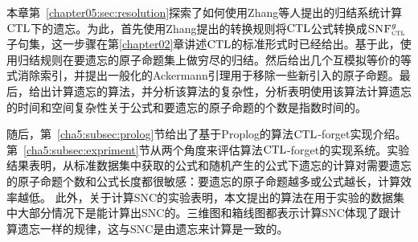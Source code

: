 本章第~\ref{chapter05:sec:resolution}探索了如何使用Zhang等人提出的归结系统计算$\textrm{CTL}$下的遗忘。为此，首先使用Zhang提出的转换规则将$\textrm{CTL}$公式转换成${\textsc{SNF}_{\textsc{ctl}}^g}$子句集，这一步骤在第\ref{chapter02}章讲述$\textrm{CTL}$的标准形式时已经给出。基于此，使用归结规则在要遗忘的原子命题集上做穷尽的归结。然后给出几个互模拟等价的等式消除索引，并提出一般化的Ackermann引理用于移除一些新引入的原子命题。最后，给出计算遗忘的算法，并分析该算法的复杂性，分析表明使用该算法计算遗忘的时间和空间复杂性关于公式和要遗忘的原子命题的个数是指数时间的。


随后，第~\ref{cha5:subsec:prolog}节给出了基于Proplog的算法$\textrm{CTL}$-forget实现介绍。第~\ref{cha5:subsec:expriment}节从两个角度来评估算法$\textrm{CTL}$-forget的实现系统。实验结果表明，从标准数据集中获取的公式和随机产生的公式下遗忘的计算对需要遗忘的原子命题个数和公式长度都很敏感：要遗忘的原子命题越多或公式越长，计算效率越低。
此外，关于计算SNC的实验表明，本文提出的算法在用于实验的数据集中大部分情况下是能计算出SNC的。三维图和箱线图都表示计算SNC体现了跟计算遗忘一样的规律，这与SNC是由遗忘来计算是一致的。
